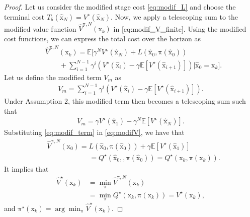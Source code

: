 \documentclass[10pt,a4paper]{amsart}
\newcommand{\vect}[1]{\ensuremath{\boldsymbol{\mathrm{#1}}}}
\begin{document}
\begin{proof}
Let us consider the modified stage cost \eqref{eq:modif_L} and choose the terminal cost $T_{\vect{\delta}}(\hat{\vect{x}}_N) = V^\star(\hat{\vect{x}}_N)$. Now, we apply a telescoping sum to the modified value function \(\hat{V}^{\vect{\pi}, N}(\vect{x}_k)\) in \eqref{eq:modif_V_finite}. Using the modified cost functions, we can express the total cost over the horizon as
\begin{align}\label{eq:modifV}
    &\hat V^{\vect\pi,N}\left(\vect x_k\right)=\mathbb{E}\Bigg[\gamma^N V^\star(\hat{\vect{x}}_N)+L\left(\hat{\vect {x}}_0,\vect\pi\left(\hat{\vect {x}}_0\right)\right)\\\nonumber
    &\qquad+\sum_{i=1}^{N-1}\gamma^i\left(V^\star(\hat{\vect{x}}_i) - \gamma \mathbb{E}[V^\star(\hat{\vect{x}}_{i+1})]\right)\Big|\hat{\vect {x}}_0=\vect x_k\Bigg].
\end{align}
Let us define the modified term $V_m$ as
\begin{align}
    V_m=\sum_{i=1}^{N-1}\gamma^i\left(V^\star(\hat{\vect{x}}_i) - \gamma \mathbb{E}[V^\star(\hat{\vect{x}}_{i+1})]\right).
\end{align}
Under Assumption 2, this modified term then becomes a telescoping sum such that
\begin{align}\label{eq:modif_term}
    V_m=\gamma V^\star(\hat{\vect{x}}_1)-\gamma^N\mathbb{E}[V^\star(\hat{\vect{x}}_N)].
\end{align}
Substituting \eqref{eq:modif_term} in \eqref{eq:modifV}, we have that
\begin{align}
    &\hat V^{\vect\pi,N}\left(\vect x_0\right)=L\left(\hat{\vect {x}}_0,\vect\pi\left(\hat{\vect {x}}_0\right)\right)+\gamma\mathbb{E}[V^\star(\hat{\vect{x}}_{1})]\\\nonumber
&\qquad\qquad\qquad=Q^\star(\hat{\vect{x}}_{0},,\vect\pi\left(\hat{\vect {x}}_0\right))=Q^\star({\vect{x}}_{k},\vect\pi\left({\vect {x}}_k\right)).
\end{align}
It implies that
\begin{align}
    \hat V^\star\left(\vect x_k\right)&=\min_{\vect\pi}\hat V^{\vect\pi,N}\left(\vect x_k\right)\\\nonumber
    &=\min_{\vect\pi}Q^\star({\vect{x}}_{k},\vect\pi\left({\vect {x}}_k\right))=V^\star\left(\vect x_k\right),
\end{align}
and ${\vect{\pi}}^\star\left(\vect x_k\right)=\arg\min_{{\vect{\pi}}} \hat V^\star\left(\vect x_k\right)$.
\end{proof}
\end{document}
